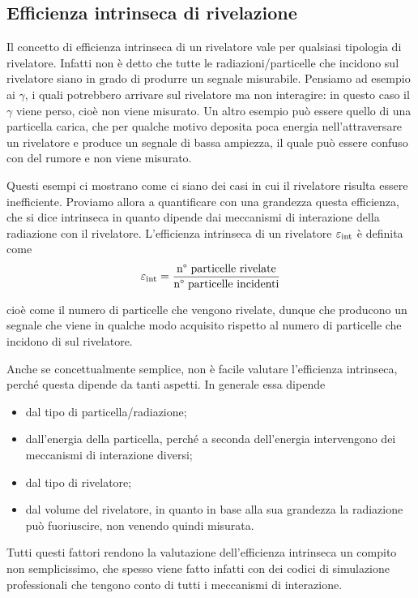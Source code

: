 \subsection{Efficienza intrinseca di rivelazione}
Il concetto di efficienza intrinseca di un rivelatore vale per qualsiasi tipologia di rivelatore. Infatti non è detto che tutte le radiazioni/particelle che incidono sul rivelatore siano in grado di produrre un segnale misurabile. Pensiamo ad esempio ai $\gamma$, i quali potrebbero arrivare sul rivelatore ma non interagire: in questo caso il $\gamma$ viene perso, cioè non viene misurato. Un altro esempio può essere quello di una particella carica, che per qualche motivo deposita poca energia nell'attraversare un rivelatore e produce un segnale di bassa ampiezza, il quale può essere confuso con del rumore e non viene misurato.

Questi esempi ci mostrano come ci siano dei casi in cui il rivelatore risulta essere inefficiente. Proviamo allora a quantificare con una grandezza questa efficienza, che si dice intrinseca in quanto dipende dai meccanismi di interazione della radiazione con il rivelatore. L'efficienza intrinseca di un rivelatore $\varepsilon_{\rm int}$ è definita come
\begin{equation*}
   \varepsilon_{\rm int}
   =\frac{\text{n° particelle rivelate}}{\text{n° particelle incidenti}}
\end{equation*}

cioè come il numero di particelle che vengono rivelate, dunque che producono un segnale che viene in qualche modo acquisito rispetto al numero di particelle che incidono di sul rivelatore.

Anche se concettualmente semplice, non è facile valutare l'efficienza intrinseca, perché questa dipende da tanti aspetti. In generale essa dipende
\begin{itemize}
   \item dal tipo di particella/radiazione;%
   \item dall'energia della particella, perché a seconda dell'energia intervengono dei meccanismi di interazione diversi;
   \item dal tipo di rivelatore;
   \item dal volume del rivelatore, in quanto in base alla sua grandezza la radiazione può fuoriuscire, non venendo quindi misurata.
\end{itemize}
  Tutti questi fattori rendono la valutazione dell'efficienza intrinseca un compito non semplicissimo, che spesso viene fatto infatti con dei codici di simulazione professionali che tengono conto di tutti i meccanismi di interazione.
